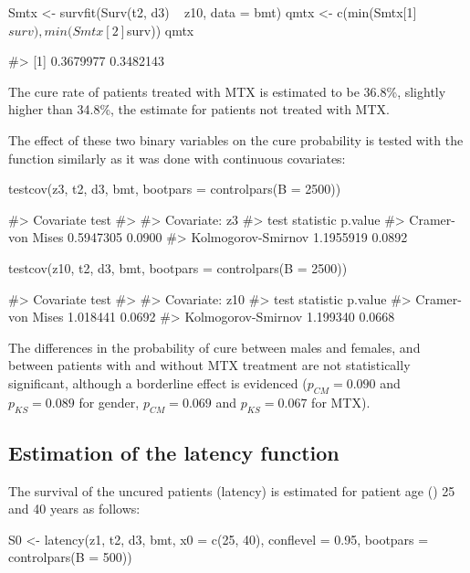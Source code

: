 \begin{example}
Smtx <- survfit(Surv(t2, d3) ~ z10, data = bmt)
qmtx <- c(min(Smtx[1]$surv), min(Smtx[2]$surv))
qmtx
\end{example}
\begin{example}
#> [1] 0.3679977 0.3482143
\end{example}

The cure rate of patients treated with MTX is estimated to be 36.8\%, slightly higher than 34.8\%, the estimate for patients not treated with MTX.

The effect of these two binary variables on the cure probability is tested with the  function similarly as it was done with continuous covariates:

\begin{example}
testcov(z3, t2, d3, bmt, bootpars = controlpars(B = 2500))
\end{example}
\begin{example}
#> Covariate test 
#>
#> Covariate:  z3 
#>                test statistic p.value
#>   Cramer-von Mises 0.5947305  0.0900
#> Kolmogorov-Smirnov 1.1955919  0.0892
\end{example}
\begin{example}
testcov(z10, t2, d3, bmt, bootpars = controlpars(B = 2500))
\end{example}
\begin{example}
#> Covariate test 
#>
#> Covariate:  z10 
#>               test statistic p.value
#>   Cramer-von Mises  1.018441  0.0692
#> Kolmogorov-Smirnov  1.199340  0.0668
\end{example}

The differences in the probability of cure between males and females, and between patients with and without MTX treatment are not statistically significant, although a borderline effect is evidenced ($p_{CM} = 0.090$ and $p_{KS} = 0.089$ for gender, $p_{CM} = 0.069$ and $p_{KS} = 0.067$ for MTX).

\subsection{Estimation of the latency function}

The survival of the uncured patients (latency) is estimated for patient age () 25 and 40 years as follows:
\begin{example}
S0 <- latency(z1, t2, d3, bmt, x0 = c(25, 40), conflevel = 0.95,
   bootpars = controlpars(B = 500))
\end{example}
   
